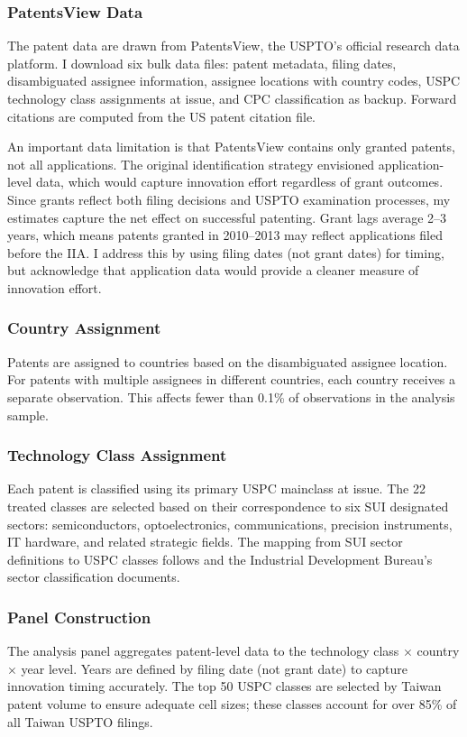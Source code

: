 \documentclass[12pt]{article}
\begin{document}
\subsubsection*{PatentsView Data} The patent data are drawn from PatentsView, the USPTO's official research data platform. I download six bulk data files: patent metadata, filing dates, disambiguated assignee information, assignee locations with country codes, USPC technology class assignments at issue, and CPC classification as backup. Forward citations are computed from the US patent citation file.

An important data limitation is that PatentsView contains only granted patents, not all applications. The original identification strategy envisioned application-level data, which would capture innovation effort regardless of grant outcomes. Since grants reflect both filing decisions and USPTO examination processes, my estimates capture the net effect on successful patenting. Grant lags average 2--3 years, which means patents granted in 2010--2013 may reflect applications filed before the IIA. I address this by using filing dates (not grant dates) for timing, but acknowledge that application data would provide a cleaner measure of innovation effort.

\subsubsection*{Country Assignment} Patents are assigned to countries based on the disambiguated assignee location. For patents with multiple assignees in different countries, each country receives a separate observation. This affects fewer than 0.1\% of observations in the analysis sample.

\subsubsection*{Technology Class Assignment} Each patent is classified using its primary USPC mainclass at issue. The 22 treated classes are selected based on their correspondence to six SUI designated sectors: semiconductors, optoelectronics, communications, precision instruments, IT hardware, and related strategic fields. The mapping from SUI sector definitions to USPC classes follows \citet{hu2005returns} and the Industrial Development Bureau's sector classification documents.

\subsubsection*{Panel Construction} The analysis panel aggregates patent-level data to the technology class $\times$ country $\times$ year level. Years are defined by filing date (not grant date) to capture innovation timing accurately. The top 50 USPC classes are selected by Taiwan patent volume to ensure adequate cell sizes; these classes account for over 85\% of all Taiwan USPTO filings.
\end{document}
